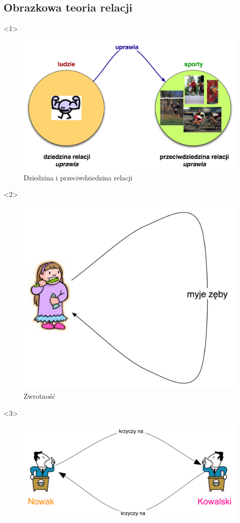 \documentclass[12pt]{article}
\begin{document}
\subsection{Obrazkowa teoria relacji}
\begin{center}
<1>{
\begin{figure}
\includegraphics[scale=0.35]{../pliki_wlasne/domainrange.jpg}
\caption{Dziedzina i przeciwdziedzina relacji}
\end{figure}
}
<2>{
\begin{figure}
\includegraphics[scale=0.45]{../pliki_wlasne/zwrotna.jpg}
\caption{Zwrotność}
\end{figure}
}
<3>{
\begin{figure}
\includegraphics[scale=0.45]{../pliki_wlasne/symetryczna.jpg}

\end{figure}}
\end{center}
\end{document}
